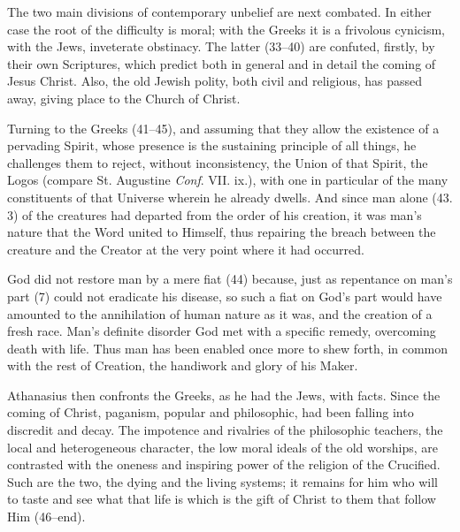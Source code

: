 The two main divisions of contemporary unbelief are next combated. In either case the root of the difficulty is moral; with the Greeks it is a frivolous cynicism, with the Jews, inveterate obstinacy. The latter (33–40) are confuted, firstly, by their own Scriptures, which predict both in general and in detail the coming of Jesus Christ. Also, the old Jewish polity, both civil and religious, has passed away, giving place to the Church of Christ.

Turning to the Greeks (41–45), and assuming that they allow the existence of a pervading Spirit, whose presence is the sustaining principle of all things, he challenges them to reject, without inconsistency, the Union of that Spirit, the Logos (compare St. Augustine \emph{Conf}. VII. ix.), with one in particular of the many constituents of that Universe wherein he already dwells. And since man alone (43. 3) of the creatures had departed from the order of his creation, it was man’s nature that the Word united to Himself, thus repairing the breach between the creature and the Creator at the very point where it had occurred.

God did not restore man by a mere fiat (44) because, just as repentance on man’s part (7) could not eradicate his disease, so such a fiat on God’s part would have amounted to the annihilation of human nature as it was, and the creation of a fresh race. Man’s definite disorder God met with a specific remedy, overcoming death with life. Thus man has been enabled once more to shew forth, in common with the rest of Creation, the handiwork and glory of his Maker.

Athanasius then confronts the Greeks, as he had the Jews, with facts. Since the coming of Christ, paganism, popular and philosophic, had been falling into discredit and decay. The impotence and rivalries of the philosophic teachers, the local and heterogeneous character, the low moral ideals of the old worships, are contrasted with the oneness and inspiring power of the religion of the Crucified. Such are the two, the dying and the living systems; it remains for him who will to taste and see what that life is which is the gift of Christ to them that follow Him (46–end).

